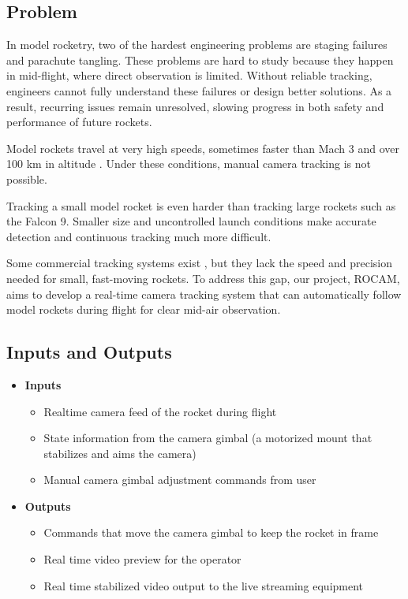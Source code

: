 \documentclass{article}
\begin{document}

\subsection{Problem}

In model rocketry, two of the hardest engineering problems are staging failures
and parachute tangling. These problems are hard to study because they happen in
mid-flight, where direct observation is limited. Without reliable tracking,
engineers cannot fully understand these failures or design better solutions. As
a result, recurring issues remain unresolved, slowing progress in both safety
and performance of future rockets.

Model rockets travel at very high speeds, sometimes faster than Mach 3 and over
100 km in altitude \citep{SpaceConcordiaRocketry2025}. Under these conditions,
manual camera tracking is not possible.

Tracking a small model rocket is even harder than tracking large rockets such as
the Falcon 9. Smaller size and uncontrolled launch conditions make accurate
detection and continuous tracking much more difficult.

Some commercial tracking systems exist \citep{AverTR3XX2021}, but they lack the
speed and precision needed for small, fast-moving rockets. To address this gap,
our project, ROCAM, aims to develop a real-time camera tracking system that can
automatically follow model rockets during flight for clear mid-air observation.


\subsection{Inputs and Outputs}
\begin{itemize}
  \item \textbf{Inputs}
        \begin{itemize}
          \item Realtime camera feed of the rocket during flight
          \item State information from the camera gimbal (a motorized mount that stabilizes and aims the camera)
          \item Manual camera gimbal adjustment commands from user
        \end{itemize}

  \item \textbf{Outputs}
        \begin{itemize}
          \item Commands that move the camera gimbal to keep the rocket in frame
          \item Real time video preview for the operator
          \item Real time stabilized video output to the live streaming equipment
        \end{itemize}
\end{itemize}
\end{document}
